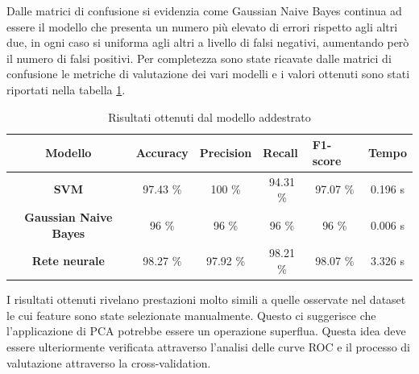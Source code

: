 Dalle matrici di confusione si evidenzia come Gaussian Naive Bayes continua ad
essere il modello che presenta un numero più elevato di errori rispetto agli
altri due, in ogni caso si uniforma agli altri a livello di falsi negativi,
aumentando però il numero di falsi positivi. Per completezza sono state ricavate
dalle matrici di confusione le metriche di valutazione dei vari modelli e i
valori ottenuti sono stati riportati nella tabella \ref{tab:risultati_pca}.
\begin{table}[!ht]
    \centering
    \begin{tabular}{@{}clllll@{}}
        \toprule
        \rowcolor[HTML]{EFEFEF}
        \textbf{Modello}                                      & \textbf{Accuracy}            & \textbf{Precision}           & \textbf{Recall}              & \textbf{F1-score}            & \textbf{Tempo}              \\ \midrule
        \cellcolor[HTML]{EFEFEF}\textbf{SVM}                  & \multicolumn{1}{c}{97.43 \%} & \multicolumn{1}{c}{100 \%}   & \multicolumn{1}{c}{94.31 \%} & \multicolumn{1}{c}{97.07 \%} & \multicolumn{1}{c}{0.196 s} \\
        \cellcolor[HTML]{EFEFEF}\textbf{Gaussian Naive Bayes} & \multicolumn{1}{c}{96 \%}    & \multicolumn{1}{c}{96 \%}    & \multicolumn{1}{c}{96 \%}    & \multicolumn{1}{c}{96 \%}    & \multicolumn{1}{c}{0.006 s} \\
        \cellcolor[HTML]{EFEFEF}\textbf{Rete neurale}         & \multicolumn{1}{c}{98.27 \%} & \multicolumn{1}{c}{97.92 \%} & \multicolumn{1}{c}{98.21 \%} & \multicolumn{1}{c}{98.07 \%} & \multicolumn{1}{c}{3.326 s} \\ \bottomrule
    \end{tabular}
    \caption{Risultati ottenuti dal modello addestrato}
    \label{tab:risultati_pca}
\end{table}

I risultati ottenuti rivelano prestazioni molto simili a quelle osservate nel
dataset le cui feature sono state selezionate manualmente. Questo ci suggerisce
che l'applicazione di PCA potrebbe essere un operazione superflua. Questa idea
deve essere ulteriormente verificata attraverso l'analisi delle curve ROC e
il processo di valutazione attraverso la cross-validation.

